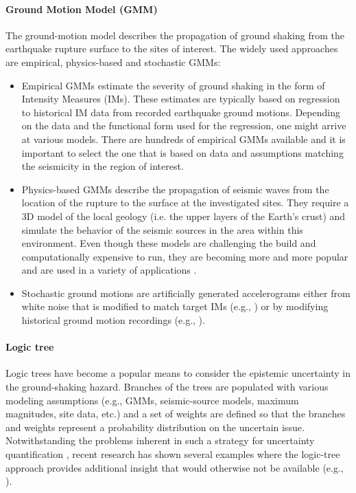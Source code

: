 \paragraph{Ground Motion Model (GMM)} The ground-motion model describes the propagation of ground shaking from the earthquake rupture surface to the sites of interest. The widely used approaches are empirical, physics-based and stochastic GMMs:
\begin{itemize}
    \item Empirical GMMs estimate the severity of ground shaking in the form of Intensity Measures (IMs). These estimates are typically based on regression to historical IM data from recorded earthquake ground motions. Depending on the data and the functional form used for the regression, one might arrive at various models. There are hundreds of empirical GMMs available \citep{douglas2018ground} and it is important to select the one that is based on data and assumptions matching the seismicity in the region of interest.
    \item Physics-based GMMs describe the propagation of seismic waves from the location of the rupture to the surface at the investigated sites. They require a 3D model of the local geology (i.e. the upper layers of the Earth's crust) and simulate the behavior of the seismic sources in the area within this environment. Even though these models are challenging the build and computationally expensive to run, they are becoming more and more popular and are used in a variety of applications \citep{bradley2017guidance}. 
    \item Stochastic ground motions are artificially generated accelerograms either from white noise that is modified to match target IMs (e.g., \cite{rezaeian2011simulation}) or by modifying historical ground motion recordings (e.g., \cite{atkinson2010inelastic, seifried2016spectral}).
\end{itemize}

\paragraph{Logic tree} Logic trees have become a popular means to consider the epistemic uncertainty in the ground-shaking hazard. Branches of the trees are populated with various modeling assumptions (e.g., GMMs, seismic-source models, maximum magnitudes, site data, etc.) and a set of weights are defined so that the branches and weights represent a probability distribution on the uncertain issue. Notwithstanding the problems inherent in such a strategy for uncertainty quantification \citep{bommer2008use}, recent research has shown several examples where the logic-tree approach provides additional insight that would otherwise not be available (e.g., \cite{goulet2017ngaeast}).

